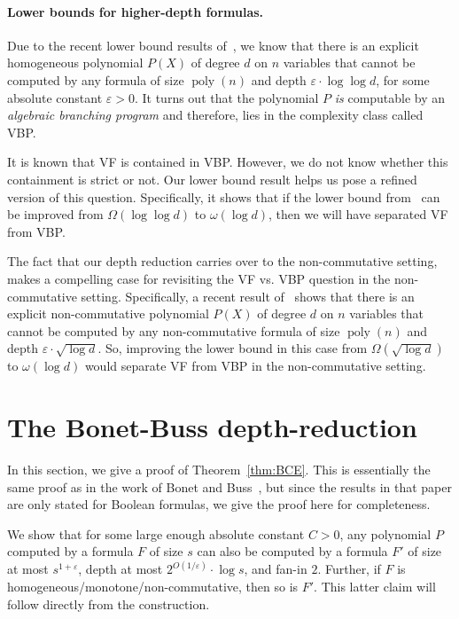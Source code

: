 \documentclass[11pt,a4paper]{article}
\newcommand{\poly}{\mathop{\mathrm{poly}}}
\begin{document}
\paragraph*{Lower bounds for higher-depth formulas.} Due to the recent lower bound results of~\cite{LST-FOCS}, we know that there is an explicit homogeneous polynomial $P(X)$ of degree $d$ on $n$ variables that cannot be computed by any formula of size $\poly(n)$ and depth $\varepsilon\cdot \log \log d$, for some absolute constant $\varepsilon > 0$. It turns out that the polynomial $P$ \emph{is} computable by an \emph{algebraic branching program} and therefore, lies in the complexity class called VBP. 

It is known that VF is contained in VBP. However, we do not know whether this containment is strict or not. Our lower bound result helps us pose a refined version of this question. Specifically, it shows that if the lower bound from~\cite{LST-FOCS} can be improved from $\Omega(\log \log d)$ to $\omega(\log d)$, then we will have separated VF from VBP. 

The fact that our depth reduction carries over to the non-commutative setting, makes a compelling case for revisiting the VF vs. VBP question in the non-commutative setting. Specifically, a recent result of~\cite{LST-STOC} shows that there is an explicit non-commutative polynomial $P(X)$ of degree $d$ on $n$ variables  that cannot be computed by any non-commutative formula of size $\poly(n)$ and depth $\varepsilon\cdot \sqrt{\log d}$. So, improving the lower bound in this case from $\Omega(\sqrt{\log d})$ to $\omega(\log d)$ would separate VF from VBP in the non-commutative setting. 





\clearpage
\appendix

\section{The Bonet-Buss depth-reduction}\label{sec:BonetBuss}

In this section, we give a proof of Theorem~\ref{thm:BCE}. This is essentially the same proof as in the work of Bonet and Buss~\cite{BonetBuss}, but since the results in that paper are only stated for Boolean formulas, we give the proof here for completeness.

We show that for some large enough absolute constant $C > 0$, any polynomial $P$ computed by a formula $F$ of size $s$ can also be computed by a formula $F'$ of size at most $s^{1+\varepsilon}$, depth at most $2^{O(1/\varepsilon)}\cdot \log s$, and fan-in $2$. Further, if $F$ is homogeneous/monotone/non-commutative, then so is $F'$. This latter claim will follow directly from the construction.
\end{document}

